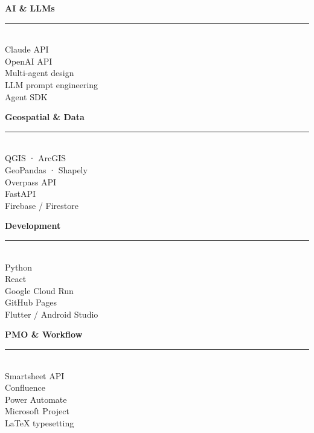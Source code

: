 \newcommand{\techcol}[2]{%
  \begin{minipage}[t]{0.22\textwidth}
    \vspace{0pt}
    {\small\textcolor{Primary2}{\textbf{#1}}}\\
    {\color{Primary2}\rule{\linewidth}{0.4pt}}\\[2pt]
    {\footnotesize #2}
  \end{minipage}%
}

\vspace{2mm}
\noindent
\techcol{AI \& LLMs}{%
  Claude API\\
  OpenAI API\\
  Multi-agent design\\
  LLM prompt engineering\\
  Agent SDK
}%
\hfill
\techcol{Geospatial \& Data}{%
  QGIS · ArcGIS\\
  GeoPandas · Shapely\\
  Overpass API\\
  FastAPI\\
  Firebase / Firestore
}%
\hfill
\techcol{Development}{%
  Python\\
  React\\
  Google Cloud Run\\
  GitHub Pages\\
  Flutter / Android Studio
}%
\hfill
\techcol{PMO \& Workflow}{%
  Smartsheet API\\
  Confluence\\
  Power Automate\\
  Microsoft Project\\
  \LaTeX{} typesetting
}%
\vspace{2mm}
